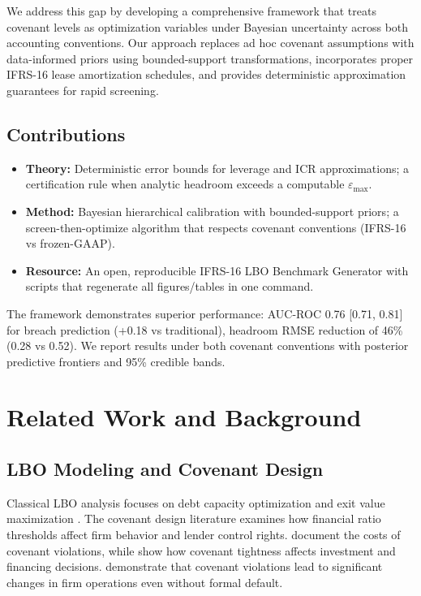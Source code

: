 \documentclass[11pt,a4paper]{article}
\theoremstyle{plain}
\theoremstyle{definition}
\begin{document}
We address this gap by developing a comprehensive framework that treats covenant levels as optimization variables under Bayesian uncertainty across both accounting conventions. Our approach replaces ad hoc covenant assumptions with data-informed priors using bounded-support transformations, incorporates proper IFRS-16 lease amortization schedules, and provides deterministic approximation guarantees for rapid screening.

\subsection{Contributions}

\begin{itemize}\setlength{\itemsep}{0pt}
\item \textbf{Theory:} Deterministic error bounds for leverage and ICR approximations; a certification rule when analytic headroom exceeds a computable $\varepsilon_{\max}$.
\item \textbf{Method:} Bayesian hierarchical calibration with bounded-support priors; a screen-then-optimize algorithm that respects covenant conventions (IFRS-16 vs frozen-GAAP).
\item \textbf{Resource:} An open, reproducible IFRS-16 LBO Benchmark Generator with scripts that regenerate all figures/tables in one command.
\end{itemize}

The framework demonstrates superior performance: AUC-ROC 0.76 [0.71, 0.81] for breach prediction (+0.18 vs traditional), headroom RMSE reduction of 46\% (0.28 vs 0.52). We report results under both covenant conventions with posterior predictive frontiers and 95\% credible bands.

\section{Related Work and Background}

\subsection{LBO Modeling and Covenant Design}

Classical LBO analysis focuses on debt capacity optimization and exit value maximization \citep{kaplan1989effects}. The covenant design literature examines how financial ratio thresholds affect firm behavior and lender control rights. \citet{dichev2002quality} document the costs of covenant violations, while \citet{ivashina2011covenant} show how covenant tightness affects investment and financing decisions. \citet{nini2009creditor} demonstrate that covenant violations lead to significant changes in firm operations even without formal default.
\end{document}
